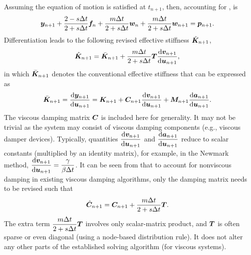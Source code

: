 Assuming the equation of motion  is satisfied at $t_{n+1}$, then, accounting for ,  is
\begin{gather}\label{eq:residual}
\bm{y}_{n+1}+\dfrac{2-s\Delta{}t}{2+s\Delta{}t}\bm{f}_n+\dfrac{m\Delta{}t}{2+s\Delta{}t}\bm{w}_n+\dfrac{m\Delta{}t}{2+s\Delta{}t}\bm{w}_{n+1}=\bm{p}_{n+1}.
\end{gather}
Differentiation leads to the following revised effective stiffness $\hat{\bm{K}}_{n+1}$,
\begin{gather}\label{eq:revised_k}
\hat{\bm{K}}_{n+1}=\bar{\bm{K}}_{n+1}+\dfrac{m\Delta{}t}{2+s\Delta{}t}\bm{T}\dfrac{\mathrm{d}\bm{v}_{n+1}}{\mathrm{d}\bm{u}_{n+1}},
\end{gather}
in which $\bar{\bm{K}}_{n+1}$ denotes the conventional effective stiffness that can be expressed as
\begin{gather}
\bar{\bm{K}}_{n+1}=\dfrac{\mathrm{d}\bm{y}_{n+1}}{\mathrm{d}\bm{u}_{n+1}}=\bm{K}_{n+1}+\bm{C}_{n+1}\dfrac{\mathrm{d}\bm{v}_{n+1}}{\mathrm{d}\bm{u}_{n+1}}+\bm{M}_{n+1}\dfrac{\mathrm{d}\bm{a}_{n+1}}{\mathrm{d}\bm{u}_{n+1}}.
\end{gather}
The viscous damping matrix $\bm{C}$ is included here for generality. It may not be trivial as the system may consist of viscous damping components (e.g., viscous damper devices). Typically, quantities $\dfrac{\mathrm{d}\bm{v}_{n+1}}{\mathrm{d}\bm{u}_{n+1}}$ and $\dfrac{\mathrm{d}\bm{a}_{n+1}}{\mathrm{d}\bm{u}_{n+1}}$ reduce to scalar constants (multiplied by an identity matrix), for example, in the Newmark method, $\dfrac{\mathrm{d}\bm{v}_{n+1}}{\mathrm{d}\bm{u}_{n+1}}=\dfrac{\gamma}{\beta\Delta{}t}$. It can be seen from  that to account for nonviscous damping in existing viscous damping algorithms, only the damping matrix needs to be revised such that
\begin{gather}
\hat{\bm{C}}_{n+1}=\bm{C}_{n+1}+\dfrac{m\Delta{}t}{2+s\Delta{}t}\bm{T}.
\end{gather}
The extra term $\dfrac{m\Delta{}t}{2+s\Delta{}t}\bm{T}$ involves only scalar-matrix product, and $\bm{T}$ is often sparse or even diagonal (using a node-based distribution rule). It does not alter any other parts of the established solving algorithm (for viscous systems).

